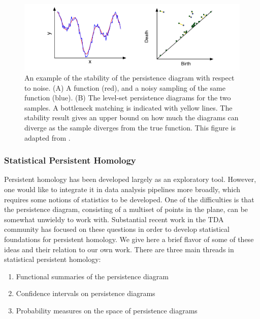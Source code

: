 \begin{figure}
\centering
\includegraphics[]{fig/background/stability_example.pdf}
\caption[Stability Example]{An example of the stability of the persistence diagram with respect to noise. (A) A function (red), and a noisy sampling of the same function (blue). (B) The level-set persistence diagrams for the two samples. A bottleneck matching is indicated with yellow lines. The stability result gives an upper bound on how much the diagrams can diverge as the sample diverges from the true function. This figure is adapted from \cite{Edelsbrunner:2010}.}
\label{fig:bg:stability_example}
\end{figure}

\subsubsection{Statistical Persistent Homology}
\label{bg:tda:ph:statistics}

Persistent homology has been developed largely as an exploratory tool.
However, one would like to integrate it in data analysis pipelines more broadly, which requires some notions of statistics to be developed.
One of the difficulties is that the persistence diagram, consisting of a multiset of points in the plane, can be somewhat unwieldy to work with.
Substantial recent work in the TDA community has focused on these questions in order to develop statistical foundations for persistent homology.
We give here a brief flavor of some of these ideas and their relation to our own work.
There are three main threads in statistical persistent homology:
\begin{enumerate}
\item Functional summaries of the persistence diagram
\item Confidence intervals on persistence diagrams
\item Probability measures on the space of persistence diagrams
\end{enumerate}

